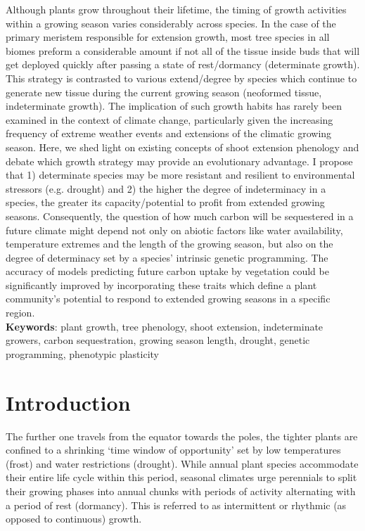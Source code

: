\documentclass{article}
\begin{document}
	Although plants grow throughout their lifetime, the timing of growth activities within a growing season varies considerably across species. In the case of the primary meristem responsible for extension growth, most tree species in all biomes preform a considerable amount if not all of the tissue inside buds that will get deployed quickly after passing a state of rest/dormancy (determinate growth). This strategy is contrasted to various extend/degree by species which continue to generate new tissue during the current growing season (neoformed tissue, indeterminate growth). The implication of such growth habits has rarely been examined in the context of climate change, particularly given the increasing frequency of extreme weather events and extensions of the climatic growing season.  Here, we shed light on existing concepts of shoot extension phenology and debate which growth strategy may provide an evolutionary advantage. I propose that 1) determinate species may be more resistant and resilient to environmental stressors (e.g. drought) and 2) the higher the degree of indeterminacy in a species, the greater its capacity/potential to profit from extended growing seasons. Consequently, the question of how much carbon will be sequestered in a future climate might depend not only on abiotic factors like water availability, temperature extremes and the length of the growing season, but also on the degree of determinacy set by a species' intrinsic genetic programming. The accuracy of models predicting future carbon uptake by vegetation could be significantly improved by incorporating these traits which define a plant community's potential to respond to extended growing seasons in a specific region.
	\\
	
	\textbf{Keywords}: plant growth, tree phenology, shoot extension, indeterminate growers, carbon sequestration, growing season length, drought, genetic programming, phenotypic plasticity
	
	
	\section*{Introduction}
	The further one travels from the equator towards the poles, the tighter plants are confined to a shrinking ‘time window of opportunity’ set by low temperatures (frost) and water restrictions (drought). While annual plant species accommodate their entire life cycle within this period, seasonal climates urge perennials to split their growing phases into annual chunks with periods of activity alternating with a period of rest (dormancy). This is referred to as intermittent or rhythmic (as opposed to continuous) growth.  
	
\end{document}
